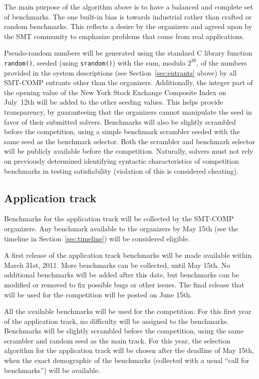\documentclass[12pt]{article}
\begin{document}
The main purpose of the algorithm above is to have a balanced and complete set
of benchmarks.  The one built-in bias is towards industrial rather than crafted
or random benchmarks.  This reflects a desire by the organizers and agreed upon
by the SMT community to emphasize problems that come from real applications.

Pseudo-random numbers will be generated using the standard C library
function \texttt{random()}, seeded (using \texttt{srandom()}) with the
sum, modulo $2^{30}$, of the numbers provided in the system
descriptions (see Section~\ref{sec:entrants} above) by all SMT-COMP
entrants other than the organizers.  Additionally, the integer part of
the opening value of the New York Stock Exchange Composite Index on
July~12th
will be added to the other seeding values.  This helps provide transparency,
by guaranteeing that the organizers cannot manipulate the seed in
favor of their submitted solvers.  Benchmarks will also be slightly
scrambled before the competition, using a simple benchmark scrambler %
seeded with the same seed as the benchmark selector.  Both the
scrambler and benchmark selector will be publicly available before the
competition.  Naturally, solvers must not rely on previously
determined identifying syntactic characteristics of competition
benchmarks in testing satisfiability (violation of this is considered
cheating).

\subsection{Application track}

Benchmarks for the application track will be collected by the SMT-COMP organizers.
Any benchmark available to the organizers by May 15th (see the timeline in
Section~\ref{sec:timeline}) will be considered eligible.

A first release of the application track
benchmarks will be made available within March 31st, 2011.
More benchmarks can be collected, until May 15th.
No additional
benchmarks will be added after this date, but benchmarks can be
modified or removed to fix possible bugs or other issues. 
The final release that will be used for the competition will be posted on 
June 15th.

All the available benchmarks will be used for the competition. 
For this first year of the application track, no difficulty will be assigned to the benchmarks.
Benchmarks will be slightly scrambled before the competition, using the same scrambler and 
random seed as the main track. 
For this year, the selection algorithm for the application track will be chosen after the
deadline of May 15th, when the exact demographic of the benchmarks (collected with a usual
``call for benchmarks'') will be available.
\end{document}
